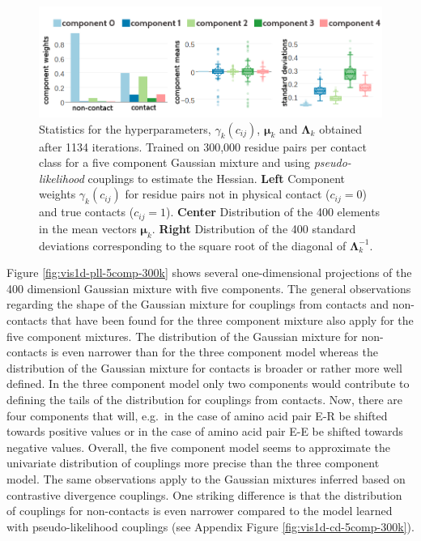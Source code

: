 \documentclass[11pt,a4paper,twoside]{book}
\newcommand{\eq}{\!=\!}
\newcommand{\Lk}{\mathbf{\Lambda}_k}
\newcommand{\muk}{\mathbf{\mu}_k}
\newcommand{\cij}{c_{ij}}
\theoremstyle{definition}
\theoremstyle{definition}
\theoremstyle{remark}
\begin{document}
\begin{figure}
\includegraphics[width=1\linewidth]{img/bayesian_model/pll/5/stats-pll-5comp-300k_contactthr25} \caption{Statistics for the hyperparameters,
\(\gamma_k(\cij)\), \(\muk\) and \(\Lk\) obtained after 1134 iterations.
Trained on 300,000 residue pairs per contact class for a five component
Gaussian mixture and using \emph{pseudo-likelihood} couplings to
estimate the Hessian. \textbf{Left} Component weights \(\gamma_k(\cij)\)
for residue pairs not in physical contact (\(\cij \eq 0\)) and true
contacts (\(\cij \eq 1\)). \textbf{Center} Distribution of the 400
elements in the mean vectors \(\muk\). \textbf{Right} Distribution of
the 400 standard deviations corresponding to the square root of the
diagonal of \(\Lk^{-1}\).}\label{fig:stats-pll-5comp-300k}
\end{figure}

Figure \ref{fig:vis1d-pll-5comp-300k} shows several one-dimensional
projections of the 400 dimensionl Gaussian mixture with five components.
The general observations regarding the shape of the Gaussian mixture for
couplings from contacts and non-contacts that have been found for the
three component mixture also apply for the five component mixtures. The
distribution of the Gaussian mixture for non-contacts is even narrower
than for the three component model whereas the distribution of the
Gaussian mixture for contacts is broader or rather more well defined. In
the three component model only two components would contribute to
defining the tails of the distribution for couplings from contacts. Now,
there are four components that will, e.g.~in the case of amino acid pair
E-R be shifted towards positive values or in the case of amino acid pair
E-E be shifted towards negative values. Overall, the five component
model seems to approximate the univariate distribution of couplings more
precise than the three component model. The same observations apply to
the Gaussian mixtures inferred based on contrastive divergence
couplings. One striking difference is that the distribution of couplings
for non-contacts is even narrower compared to the model learned with
pseudo-likelihood couplings (see Appendix Figure
\ref{fig:vis1d-cd-5comp-300k}).
\end{document}
